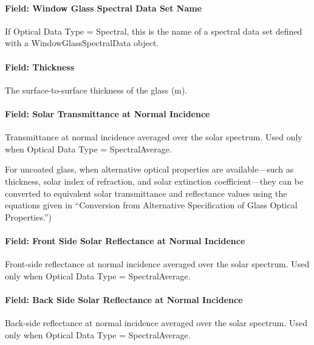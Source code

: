 \paragraph{Field: Window Glass Spectral Data Set Name}\label{field-window-glass-spectral-data-set-name}

If Optical Data Type = Spectral, this is the name of a spectral data set defined with a WindowGlassSpectralData object.

\paragraph{Field: Thickness}\label{field-thickness-1}

The surface-to-surface thickness of the glass (m).

\paragraph{Field: Solar Transmittance at Normal Incidence}\label{field-solar-transmittance-at-normal-incidence}

Transmittance at normal incidence averaged over the solar spectrum. Used only when Optical Data Type = SpectralAverage.

For uncoated glass, when alternative optical properties are available---such as thickness, solar index of refraction, and solar extinction coefficient---they can be converted to equivalent solar transmittance and reflectance values using the equations given in ``Conversion from Alternative Specification of Glass Optical Properties.'')

\paragraph{Field: Front Side Solar Reflectance at Normal Incidence}\label{field-front-side-solar-reflectance-at-normal-incidence}

Front-side reflectance at normal incidence averaged over the solar spectrum. Used only when Optical Data Type = SpectralAverage.

\paragraph{Field: Back Side Solar Reflectance at Normal Incidence}\label{field-back-side-solar-reflectance-at-normal-incidence}

Back-side reflectance at normal incidence averaged over the solar spectrum. Used only when Optical Data Type = SpectralAverage.


